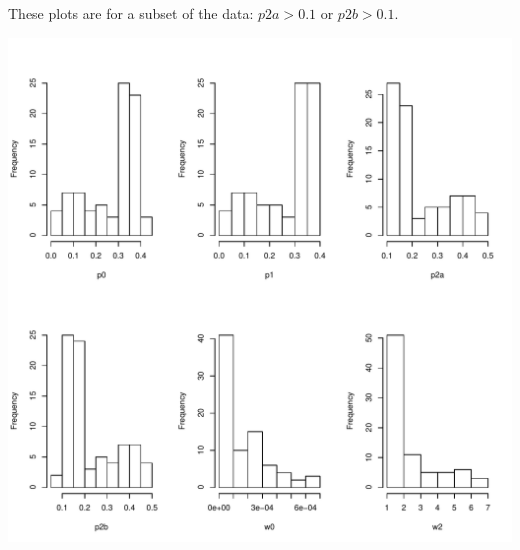 \documentclass[12pt,letterpaper]{article}\usepackage[]{graphicx}\usepackage[]{color}
\makeatletter
\def\maxwidth{ %
  \ifdim\Gin@nat@width>\linewidth
    \linewidth
  \else
    \Gin@nat@width
  \fi
}
\newenvironment{knitrout}{}{} %
\makeatother
\begin{document}
\clearpage

These plots are for a subset of the data: $p2a>0.1$ or $p2b>0.1$.
\begin{knitrout}
\color{fgcolor}

{\centering \includegraphics[width=\maxwidth]{figures/data2-1} 

}



\end{knitrout}

\clearpage
\end{document}
